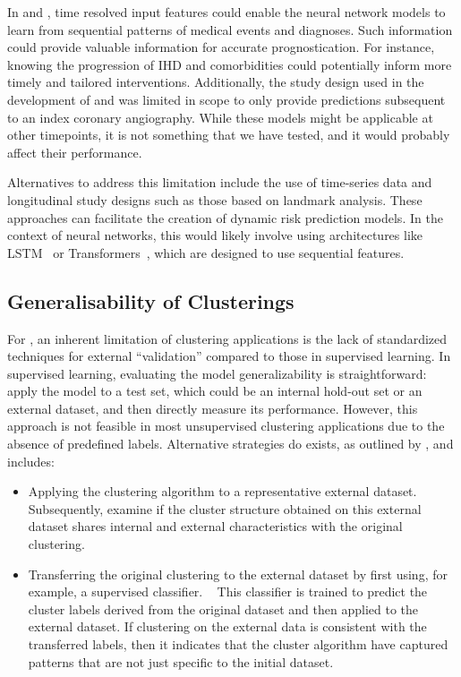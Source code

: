In \studyii{} and \studyiii{}, time resolved input features could enable 
the neural network models to learn from sequential patterns of medical
events and diagnoses. Such information could provide valuable information
for accurate prognostication. For instance, knowing the progression of 
\ac{IHD} and comorbidities could potentially inform more timely and tailored
interventions. Additionally, the study design used in the development of
 and  was limited in scope to only provide predictions
subsequent to an index coronary angiography. While these models 
might be applicable at other timepoints, it is not something that we have tested,
and it would probably affect their performance.

Alternatives to address this limitation include the use of time-series data 
and longitudinal study designs such as those based on landmark analysis.
\autocite{dafniLandmark2011}
These approaches can facilitate the creation of dynamic risk prediction
models.
\autocite{vanhouwelingenDynamic2007}
In the context of neural networks, this would likely involve
using architectures like 
\ac{LSTM}~\autocite{hochreiterLong1997}
or Transformers~\autocite{vaswaniAttention2017},
which are designed to use sequential features.

\subsection{Generalisability of Clusterings}

For \studyi{},
an inherent limitation of clustering applications is 
the lack of standardized techniques for external \enquote{validation}
compared to those in supervised learning.
In supervised learning, 
evaluating the model generalizability is straightforward:
apply the model to a test set, 
which could be an internal hold-out set or an external dataset,
and then directly measure its performance.
However, this approach is not feasible in most unsupervised clustering
applications due to the absence of predefined labels.
Alternative strategies do exists,
as outlined by \textcite{ullmannValidation2022},
and includes:
\begin{itemize}
    \item Applying the clustering algorithm to a representative external
        dataset. Subsequently, examine if the cluster structure obtained on
        this external dataset shares internal and external characteristics with
        the original clustering. 
    \item Transferring the original clustering to the external dataset by first
        using, for example, a supervised classifier. 
        ~\autocite{ullmannValidation2022}
        This classifier is trained to predict
        the cluster labels derived from the original dataset and then applied
        to the external dataset. 
        If clustering on the external data is consistent with the transferred
        labels, then it indicates that the cluster algorithm have 
        captured patterns that are not just specific to the initial
        dataset.
\end{itemize}

